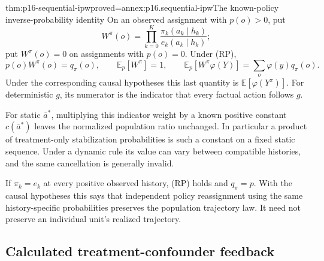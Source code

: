 \begin{hbtheorem}{thm:p16-sequential-ipw}{proved=annex:p16.sequential-ipw}{The known-policy inverse-probability identity}
On an observed assignment with \(p(o)>0\), put
\[
 W^\pi(o)=\prod_{k=0}^K\frac{\pi_k(a_k\mid h_k)}{e_k(a_k\mid h_k)};
\]
put \(W^\pi(o)=0\) on assignments with \(p(o)=0\). Under (RP),
\[
 p(o)W^\pi(o)=q_\pi(o),\qquad
 \mathbb E_p[W^\pi]=1,\qquad
 \mathbb E_p[W^\pi\varphi(Y)]=\sum_o\varphi(y)q_\pi(o).
\]
Under the corresponding causal hypotheses this last quantity is
\(\mathbb E[\varphi(Y^\pi)]\). For deterministic \(g\), its numerator
is the indicator that every factual action follows \(g\).

For static \(\bar a^*\), multiplying this indicator weight by a known
positive constant \(c(\bar a^*)\) leaves the normalized population ratio
unchanged. In particular a product of treatment-only stabilization
probabilities is such a constant on a fixed static sequence. Under a
dynamic rule its value can vary between compatible histories, and the
same cancellation is generally invalid.

If \(\pi_k=e_k\) at every positive observed history, (RP) holds and
\(q_\pi=p\). With the causal hypotheses this says that independent
policy reassignment using the same history-specific probabilities preserves
the population trajectory law. It need not preserve an individual unit's
realized trajectory.
\end{hbtheorem}

\subsection{Calculated treatment-confounder feedback}

